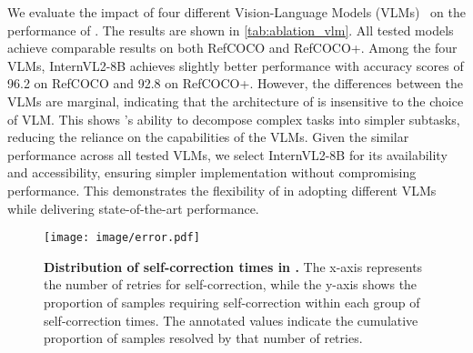 We evaluate the impact of four different Vision-Language Models (VLMs)~\cite{li_blip-2_2023, xue_xgen-mm_2024, liu_improved_2023, chen_internvl_2024} on the performance of \methodname{}. The results are shown in \autoref{tab:ablation_vlm}. All tested models achieve comparable results on both RefCOCO and RefCOCO+. 
Among the four VLMs, InternVL2-8B achieves slightly better performance with accuracy scores of 96.2 on RefCOCO and 92.8 on RefCOCO+. However, the differences between the VLMs are marginal, indicating that the architecture of \methodname{} is insensitive to the choice of VLM. This shows \methodname{}'s ability to decompose complex tasks into simpler subtasks, reducing the reliance on the capabilities of the VLMs.
Given the similar performance across all tested VLMs, we select InternVL2-8B for its availability and accessibility, ensuring simpler implementation without compromising performance. This demonstrates the flexibility of \methodname{} in adopting different VLMs while delivering state-of-the-art performance.


\begin{figure*}[t]
\centering
\texttt{[image: image/error.pdf]}
\caption{\textbf{Distribution of self-correction times in \methodname{}.} The x-axis represents the number of retries for self-correction, while the y-axis shows the proportion of samples requiring self-correction within each group of self-correction times. The annotated values indicate the cumulative proportion of samples resolved by that number of retries.}
\label{fig:error}
\end{figure*}

